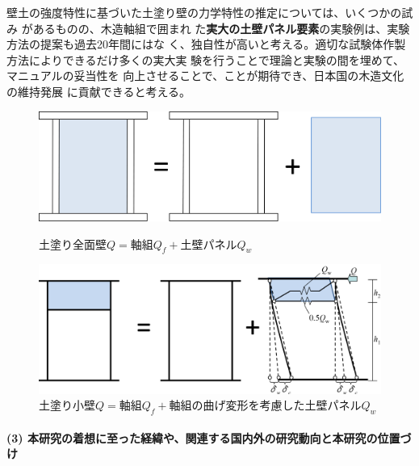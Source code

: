 \documentclass[11pt,a4paper,uplatex,dvipdfmx]{ujarticle} 		%
\newcommand{\研究課題名}{伝統的な木造土塗り壁の復元力に及ぼす軸組の影響に関する実験研究}
\newcommand{\研究機関名}{公立鳥取環境大学}
\newcommand{\研究代表者氏名}{中治弘行}
\newcommand{\私}{{\研究代表者氏名}}
\newcommand{\研究期間の最終元号年度}{8}  %
\begin{document}
壁土の強度特性に基づいた土塗り壁の力学特性の推定については、いくつかの試み
がある\cite{fukumoto2000,ochi2019,yamada2011}ものの、木造軸組で囲まれ
た\textbf{実大の土壁パネル要素}の実験例は、実験方法の提案も過去20年間にはな
く、独自性が高いと考える。適切な試験体作製方法によりできるだけ多くの実大実
験を行うことで理論と実験の間を埋めて、マニュアル\cite{manual2019}の妥当性を
向上させることで、ことが期待でき、日本国の木造文化の維持発展
に貢献できると考える。

\begin{figure}[ht]
\begin{minipage}[b]{0.45\textwidth}
\centering\includegraphics[width=\textwidth]{fig1}
\caption{土塗り全面壁$Q=$軸組$Q_f+$土壁パネル$Q_w$}
\label{fig:1}
\end{minipage}\hfill
\begin{minipage}[b]{0.45\textwidth}
\centering\includegraphics[width=\textwidth]{fig2}
\caption{土塗り小壁$Q=$軸組$Q_f+$軸組の曲げ変形を考慮した土壁パネル$Q_w$}
\label{fig:2}
\end{minipage}
\end{figure}
\vspace{-\baselineskip}

\paragraph{(3) 本研究の着想に至った経緯や、関連する国内外の研究動向と本研究の位置づけ}
\mbox{}\par
\end{document}
